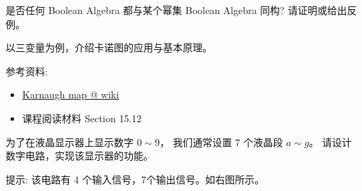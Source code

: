 \documentclass[a4paper, justified]{tufte-handout}
\begin{document}
\begin{solution}
\end{solution}


\beginoptional

\begin{problem}[Isomorphic]
  是否任何 Boolean Algebra 都与某个幂集 Boolean Algebra 同构?
  请证明或给出反例。
\end{problem}

\begin{solution}
\end{solution}

\beginot

\begin{ot}
  以三变量为例，介绍卡诺图的应用与基本原理。

  参考资料:
  \begin{itemize}
    \item \href{https://en.wikipedia.org/wiki/Karnaugh\_map}{Karnaugh map @ wiki}
    \item 课程阅读材料 Section 15.12
  \end{itemize}
\end{ot}

\vspace{0.50cm}
\begin{ot}
  为了在液晶显示器上显示数字 $0 \sim 9$，
  我们通常设置 7 个液晶段 $a \sim g$。
  请设计数字电路，实现该显示器的功能。

  提示: 该电路有 4 个输入信号，7个输出信号。如右图所示。
\end{ot}




\beginfb

\end{document}
